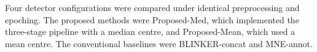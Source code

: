 Four detector configurations were compared under identical preprocessing and epoching. The proposed methods were Proposed-Med, which implemented the three-stage pipeline with a median centre, and Proposed-Mean, which used a mean centre. The conventional baselines were BLINKER-concat and MNE-annot.
